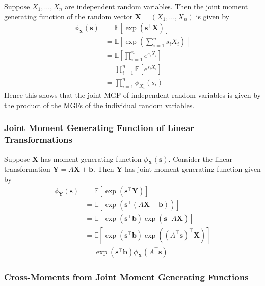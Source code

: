 \documentclass[11pt]{report} %
\begin{document}
Suppose $X_{1}, \dots, X_{n}$ are independent random variables. Then the joint moment generating function of the random vector $\mathbf{X} = \left(X_{1}, \dots, X_{n}\right)$ is given by
\begin{align}
\phi_{\mathbf{X}}\left(\mathbf{s}\right) &= \mathbb{E}\left[\exp\left(\mathbf{s}^{\top}\mathbf{X}\right)\right] \\
&= \mathbb{E}\left[\exp\left(\sum_{i = 1}^{n}s_{i}X_{i}\right)\right] \\
&= \mathbb{E}\left[\prod_{i = 1}^{n}e^{s_{i}X_{i}}\right] \\
&= \prod_{i = 1}^{n}\mathbb{E}\left[e^{s_{i}X_{i}}\right] \\
&= \prod_{i = 1}^{n}\phi_{X_{i}}\left(s_{i}\right)
\end{align}
Hence this shows that the joint MGF of independent random variables is given by the product of the MGFs of the individual random variables.

\subsubsection{Joint Moment Generating Function of Linear Transformations}

Suppose $\mathbf{X}$ has moment generating function $\phi_{\mathbf{X}}\left(\mathbf{s}\right)$. Consider the linear transformation $\mathbf{Y} = A\mathbf{X} + \mathbf{b}$. Then $\mathbf{Y}$ has joint moment generating function given by
\begin{align}
\phi_{\mathbf{Y}}\left(\mathbf{s}\right) &= \mathbb{E}\left[\exp\left(\mathbf{s}^{\top}\mathbf{Y}\right)\right] \\
&= \mathbb{E}\left[\exp\left(\mathbf{s}^{\top}\left(A\mathbf{X} + \mathbf{b}\right)\right)\right] \\
&= \mathbb{E}\left[\exp\left(\mathbf{s}^{\top}\mathbf{b}\right)\exp\left(\mathbf{s}^{\top}A\mathbf{X}\right)\right] \\
&= \mathbb{E}\left[\exp\left(\mathbf{s}^{\top}\mathbf{b}\right)\exp\left(\left(A^{\top}\mathbf{s}\right)^{\top}\mathbf{X}\right)\right] \\
&= \exp\left(\mathbf{s}^{\top}\mathbf{b}\right)\phi_{\mathbf{X}}\left(A^{\top}\mathbf{s}\right)
\end{align}

\subsubsection{Cross-Moments from Joint Moment Generating Functions}
\end{document}
